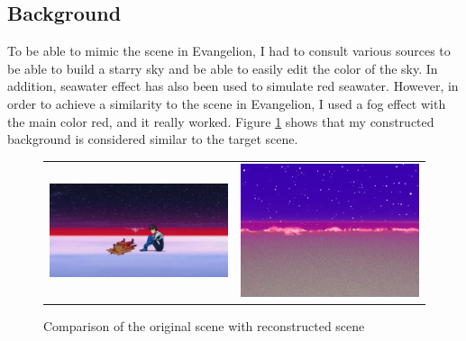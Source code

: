 \documentclass[runningheads]{llncs}
\begin{document}
    \subsection{Background}
    To be able to mimic the scene in Evangelion, I had to consult various sources to be able to build a starry sky and be able to easily edit the color of the sky. In addition, seawater effect has also been used to simulate red seawater. However, in order to achieve a similarity to the scene in Evangelion, I used a fog effect with the main color red, and it really worked. Figure \ref{fig:theme} shows that my constructed background is considered similar to the target scene.
    \begin{figure}[!htb]
        \centering
        \begin{tabular}{c c}
            \includegraphics[width=.45\textwidth]{assets/c1ffc823e71d47ba485b61ee39bd40710c-Evangelion.2x.rsocial.w600.jpg} & 
            \includegraphics[width=.45\textwidth]{assets/scene.png} \\
        \end{tabular}
        \caption{Comparison of the original scene with reconstructed scene}
        \label{fig:theme}
    \end{figure}
    
\end{document}
